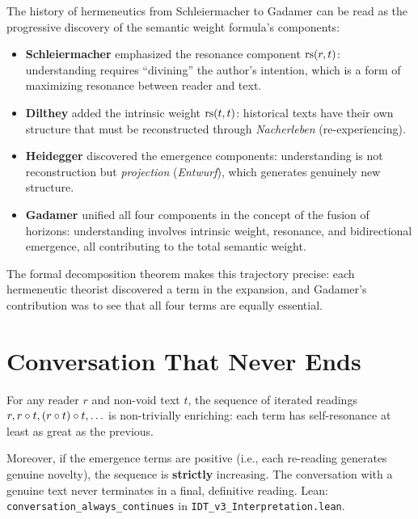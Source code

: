 \begin{interpretation}
\label{interp:schleiermacher-gadamer}
The history of hermeneutics from Schleiermacher to Gadamer can be read as
the progressive discovery of the semantic weight formula's components:

\begin{itemize}
\item \textbf{Schleiermacher} emphasized the resonance component $\mathrm{rs}(r, t)$:
understanding requires ``divining'' the author's intention, which is a form
of maximizing resonance between reader and text.

\item \textbf{Dilthey} added the intrinsic weight $\mathrm{rs}(t, t)$: historical
texts have their own structure that must be reconstructed through
\textit{Nacherleben} (re-experiencing).

\item \textbf{Heidegger} discovered the emergence components: understanding
is not reconstruction but \emph{projection} (\textit{Entwurf}), which
generates genuinely new structure.

\item \textbf{Gadamer} unified all four components in the concept of
the fusion of horizons: understanding involves intrinsic weight, resonance,
and bidirectional emergence, all contributing to the total semantic weight.
\end{itemize}

The formal decomposition theorem makes this trajectory precise: each
hermeneutic theorist discovered a term in the expansion, and Gadamer's
contribution was to see that all four terms are equally essential.
\end{interpretation}

\section{Conversation That Never Ends}

\begin{theorem}
\label{thm:conversation-continues}
For any reader $r$ and non-void text $t$, the sequence of iterated readings
$r, r \circ t, (r \circ t) \circ t, \ldots$ is non-trivially
enriching: each term has self-resonance at least as great as the previous.

Moreover, if the emergence terms are positive (i.e., each re-reading generates
genuine novelty), the sequence is \textbf{strictly} increasing.  The
conversation with a genuine text never terminates in a final, definitive reading.
Lean: \texttt{conversation\_always\_continues} in \texttt{IDT\_v3\_Interpretation.lean}.
\end{theorem}


